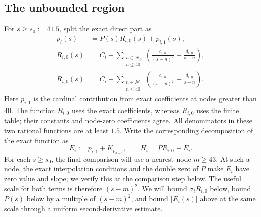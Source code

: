 \subsection{The unbounded region}

For $s\ge s_0:=41.5$, split the exact direct part as
\begin{equation}\label{signs:tail-split}
 \begin{aligned}
 p_i(s)&=P(s)R_{i,0}(s)+p_{i,1}(s),\\
 R_{i,0}(s)&=C_i+
   \sum_{\substack{n\in\mathcal N_0\\n\le40}}
   \left(\frac{c_{i,n}}{(s-n)^2}+\frac{d_{i,n}}{s-n}\right),\\
 \widetilde R_{i,0}(s)&=C_i+
   \sum_{\substack{n\in\mathcal N_0\\n\le40}}
   \left(\frac{\widetilde c_{i,n}}{(s-n)^2}
         +\frac{\widetilde d_{i,n}}{s-n}\right).
 \end{aligned}
\end{equation}
Here $p_{i,1}$ is the cardinal contribution from exact coefficients at
nodes greater than $40$.  The function $R_{i,0}$ uses the exact coefficients,
whereas
$\widetilde R_{i,0}$ uses the finite table; their constants and node-zero
coefficients agree.  All denominators in these two rational functions are
at least $1.5$.  Write the corresponding decomposition of the exact
function as
\[
 E_i:=p_{i,1}+K_{p_{3-i}},\qquad H_i=P R_{i,0}+E_i.
\]
For each $s\ge s_0$, the final comparison will use a nearest node $m\ge43$.
At such a node, the exact interpolation conditions and the double zero of
$P$ make $E_i$ have zero value and slope; we verify this at the comparison
step below.  The useful scale for both terms is therefore $(s-m)^2$.  We will bound
$\sigma_iR_{i,0}$ below, bound $P(s)$ below by a multiple of $(s-m)^2$,
and bound $|E_i(s)|$ above at the same scale through a uniform
second-derivative estimate.

